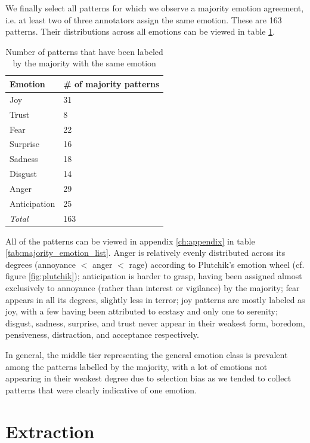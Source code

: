We finally select all patterns for which we observe a majority emotion agreement, i.e. at least two of three annotators assign the same emotion. These are 163 patterns. Their distributions across all emotions can be viewed in table \ref{tab:pattern_emotion_distribution}.

\begin{table}[h]
\centering
\begin{tabular}{l|l}
{\bf Emotion} & {\bf \# of majority patterns} \\\hline
Joy           & 31\\
Trust         & 8\\
Fear          & 22\\
Surprise      & 16\\
Sadness       & 18\\
Disgust       & 14\\
Anger         & 29\\
Anticipation  & 25\\\hline
\textit{Total} & 163
\end{tabular}
\caption{Number of patterns that have been labeled by the majority with the same emotion}
\label{tab:pattern_emotion_distribution}
\end{table}

All of the patterns can be viewed in appendix \ref{ch:appendix} in table \ref{tab:majority_emotion_list}. Anger is relatively evenly distributed across its degrees (annoyance $<$ anger $<$ rage) according to Plutchik's emotion wheel (cf. figure \ref{fig:plutchik}); anticipation is harder to grasp, having been assigned almost exclusively to annoyance (rather than interest or vigilance) by the majority; fear appears in all its degrees, slightly less in terror; joy patterns are mostly labeled as joy, with a few having been attributed to ecstasy and only one to serenity; disgust, sadness, surprise, and trust never appear in their weakest form, boredom, pensiveness, distraction, and acceptance respectively.

In general, the middle tier representing the general emotion class is prevalent among the patterns labelled by the majority, with a lot of emotions not appearing in their weakest degree due to selection bias as we tended to collect patterns that were clearly indicative of one emotion.

\section{Extraction} \label{sec:extraction}

